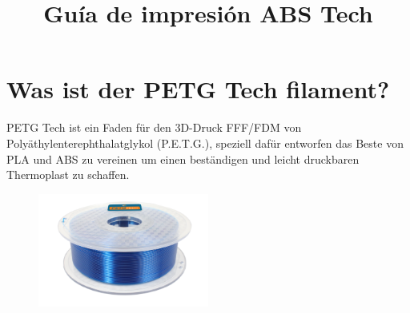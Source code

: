 \documentclass[11pt,a4paper]{article}
\title{Guía de impresión ABS Tech}
\date{}
\begin{document}

\section{﻿Was ist der PETG Tech filament?}PETG Tech ist ein Faden für den 3D-Druck FFF/FDM von Polyäthylenterephthalatglykol (P.E.T.G.), speziell dafür entworfen das Beste von PLA und ABS zu vereinen um einen beständigen und leicht druckbaren Thermoplast zu schaffen.
\begin{figure}[H]
\centering
\includegraphics[width=0.5\textwidth,cfbox=azul_marcos 1pt 0pt]{FOTOS/PETGKILOAZUL}
\end{figure}
\end{document}
